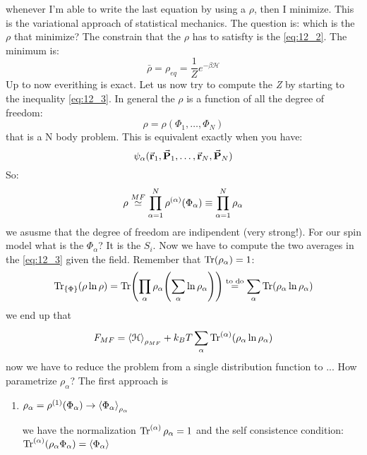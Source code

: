 \documentclass[../main/main.tex]{subfiles}
\begin{document}
whenever I'm able to write the last equation by using a \( \rho  \), then I minimize. This is the variational approach of statistical mechanics. The question is: which is the \( \rho  \) that minimize?
The constrain that the \( \rho  \) has to satisfty is the \eqref{eq:12_2}.
The minimum is:
\begin{equation}
  \bar{\rho } = \rho _{eq} = \frac{1}{Z} e^{-\beta \mathcal{H}}
\end{equation}
Up to now everithing is exact. Let us now try to compute the \emph{Z} by starting to the inequality \eqref{eq:12_3}.
In general the \( \rho  \) is a function of all the degree of freedom:
\begin{equation}
  \rho = \rho (\Phi _1, \dots, \Phi _N)
\end{equation}
that is a N body problem. This is equivalent exactly when you have:
\begin{equation}
  \psi _ \alpha (\va{r}_1, \va{P}_1, \dots, \va{r}_N, \va{P}_N )
\end{equation}
So:
\begin{equation}
  \rho \overset{MF}{\simeq } \prod_{\alpha =1}^{N} \rho^{(\alpha )}\qty(\Phi _ \alpha ) \equiv \prod_{\alpha =1}^{N} \rho_ \alpha
\end{equation}
we asusme that the degree of freedom are indipendent (very strong!). For our spin model what is the \( \Phi _ \alpha  \)? It is the \( S_i \).
Now we have to compute the two averages in the \eqref{eq:12_3} given the field.
Remember that \( \Tr(\rho _ \alpha ) = 1  \):
\begin{equation}
  \Tr_{\{ \Phi  \}  } ( \rho \ln{\rho } ) = \Tr(\prod_{\alpha }^{} \rho _ \alpha  \qty( \sum_{\alpha }^{} \ln{\rho _ \alpha }  ) ) \overset{\text{to do}}{=} \sum_{\alpha }^{}
  \Tr(\rho _ \alpha  \ln{\rho _ \alpha } )
\end{equation}
we end up that
\begin{equation}
  F_{MF} = \expval{\mathcal{H}}_{\rho _{MF}} + k_B T \sum_{\alpha }^{} \Tr^{(\alpha )}(\rho _ \alpha  \ln{\rho _ \alpha } )
\end{equation}
now we have to reduce the problem from a single distribution function to ...
How parametrize \( \rho _ \alpha  \)?
The first approach is
\begin{enumerate}
\item \( \rho _ \alpha = \rho ^{(1)} ( \Phi _{\alpha })  \rightarrow  \expval{\Phi _ \alpha }_ {\rho _ \alpha } \)

we have the normalization \( \Tr^{(\alpha )} \rho _ \alpha = 1  \) and the self consistence condition: \( \Tr^{(\alpha )}(\rho _ \alpha \Phi _ \alpha ) = \expval{\Phi _ \alpha }   \)

\end{enumerate}
\end{document}
